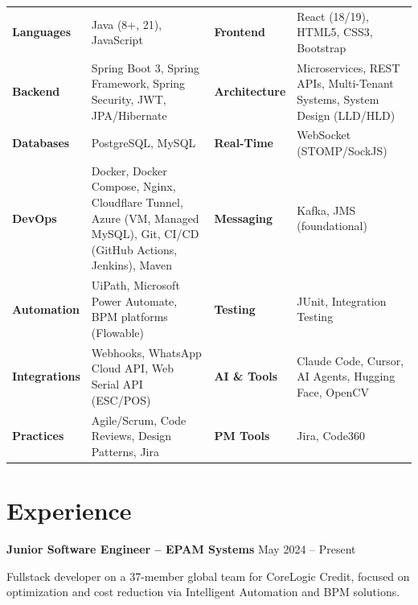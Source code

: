 \documentclass[10pt]{article}
\begin{document}
\begin{tabular}{@{} >{\bfseries}p{} p{} >{\bfseries}p{} p{} @{}}
Languages  & Java (8+, 21), JavaScript                                  & Frontend   & React (18/19), HTML5, CSS3, Bootstrap \\[3pt]
Backend    & Spring Boot 3, Spring Framework, Spring Security, JWT, JPA/Hibernate & Architecture & Microservices, REST APIs, Multi-Tenant Systems, System Design (LLD/HLD) \\[3pt]
Databases  & PostgreSQL, MySQL                                          & Real-Time  & WebSocket (STOMP/SockJS) \\[3pt]
DevOps     & Docker, Docker Compose, Nginx, Cloudflare Tunnel, Azure (VM, Managed MySQL), Git, CI/CD (GitHub Actions, Jenkins), Maven & Messaging  & Kafka, JMS (foundational) \\[3pt]
Automation & UiPath, Microsoft Power Automate, BPM platforms (Flowable) & Testing    & JUnit, Integration Testing \\[3pt]
Integrations & Webhooks, WhatsApp Cloud API, Web Serial API (ESC/POS)   & AI \& Tools & Claude Code, Cursor, AI Agents, Hugging Face, OpenCV \\[3pt]
Practices  & Agile/Scrum, Code Reviews, Design Patterns, Jira          & PM Tools   & Jira, Code360 \\
\end{tabular}

\section*{Experience}

\textbf{Junior Software Engineer -- EPAM Systems} \hfill May 2024 -- Present

Fullstack developer on a 37-member global team for CoreLogic Credit, focused on optimization and cost reduction via Intelligent Automation and BPM solutions.
\end{document}

